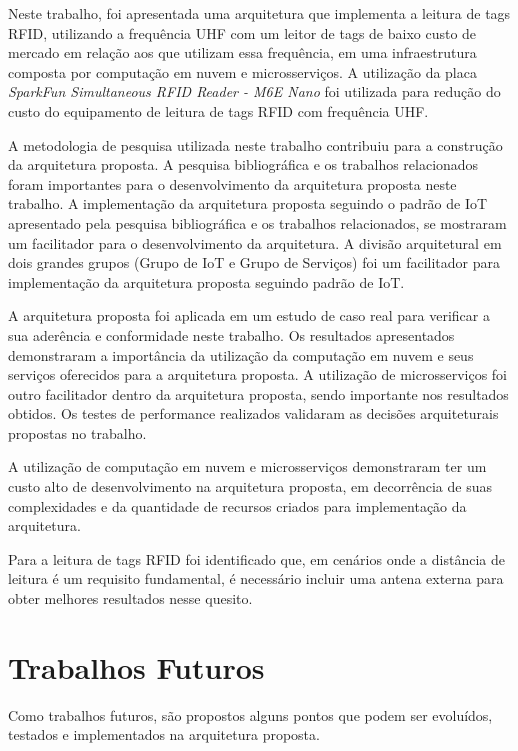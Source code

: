 \label{cap:conclusao}

Neste trabalho, foi apresentada uma arquitetura que implementa a leitura de tags \acrshort{RFID}, utilizando a frequência \acrshort{UHF} com um leitor de tags de baixo custo de mercado em relação aos que utilizam essa frequência, em uma infraestrutura composta por computação em nuvem e microsserviços. A utilização da placa \textit{SparkFun Simultaneous RFID Reader - M6E Nano} foi utilizada para redução do custo do equipamento de leitura de tags \acrshort{RFID} com frequência \acrshort{UHF}.

A metodologia de pesquisa utilizada neste trabalho contribuiu para a construção da arquitetura proposta. A pesquisa bibliográfica e os trabalhos relacionados foram importantes para o desenvolvimento da arquitetura proposta neste trabalho. A implementação da arquitetura proposta seguindo o padrão de \acrlong{IoT} apresentado pela pesquisa bibliográfica e os trabalhos relacionados, se mostraram um facilitador para o desenvolvimento da arquitetura. A divisão arquitetural em dois grandes grupos (Grupo de \acrlong{IoT} e Grupo de Serviços) foi um facilitador para implementação da arquitetura proposta seguindo padrão de \acrlong{IoT}.

A arquitetura proposta foi aplicada em um estudo de caso real para verificar a sua aderência e conformidade neste trabalho. Os resultados apresentados demonstraram a importância da utilização da computação em nuvem e seus serviços oferecidos para a arquitetura proposta. A utilização de microsserviços foi outro facilitador dentro da arquitetura proposta, sendo importante nos resultados obtidos. Os testes de performance realizados validaram as decisões arquiteturais propostas no trabalho.

A utilização de computação em nuvem e microsserviços demonstraram ter um custo alto de desenvolvimento na arquitetura proposta, em decorrência de suas complexidades e da quantidade de recursos criados para implementação da arquitetura.

Para a leitura de tags \acrshort{RFID} foi identificado que, em cenários onde a distância de leitura é um requisito fundamental, é necessário incluir uma antena externa para obter melhores resultados nesse quesito.

\section{Trabalhos Futuros}

Como trabalhos futuros, são propostos alguns pontos que podem ser evoluídos, testados e implementados na arquitetura proposta.

